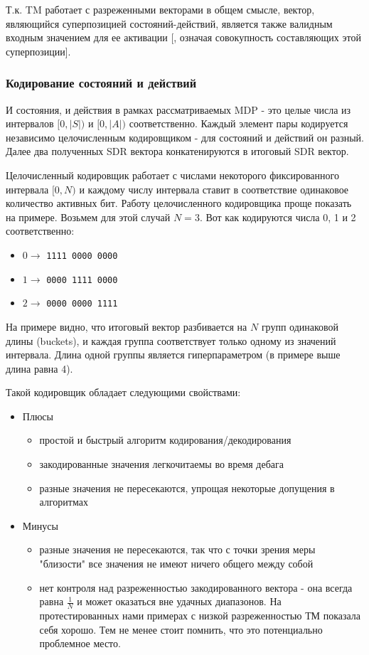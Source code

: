 \documentclass[a4paper]{article}
\begin{document}
Т.к. TM работает с разреженными векторами в общем смысле, вектор, являющийся суперпозицией состояний-действий, является также валидным входным значением для ее активации [, означая совокупность составляющих этой суперпозиции].

\subsubsection{Кодирование состояний и действий}

И состояния, и действия в рамках рассматриваемых MDP - это целые числа из интервалов $[0, |S|)$ и $[0, |A|)$ соответственно. Каждый элемент пары кодируется независимо целочисленным кодировщиком - для состояний и действий он разный. Далее два полученных SDR вектора конкатенируются в итоговый SDR вектор.

Целочисленный кодировщик работает с числами некоторого фиксированного интервала $[0, N)$ и каждому числу интервала ставит в соответствие одинаковое количество активных бит. Работу целочисленного кодировщика проще показать на примере. Возьмем для этой случай $N = 3$. Вот как кодируются числа 0, 1 и 2 соответственно:

\begin{itemize}
  \item $0 \rightarrow$ \verb|1111 0000 0000|
  \item $1 \rightarrow$ \verb|0000 1111 0000|
  \item $2 \rightarrow$ \verb|0000 0000 1111|
\end{itemize}

На примере видно, что итоговый вектор разбивается на $N$ групп одинаковой длины (buckets), и каждая группа соответствует только одному из значений интервала. Длина одной группы является гиперпараметром (в примере выше длина равна 4).

Такой кодировщик обладает следующими свойствами:

\begin{itemize}
  \item Плюсы
  \begin{itemize}
    \item простой и быстрый алгоритм кодирования/декодирования
    \item закодированные значения легкочитаемы во время дебага
    \item разные значения не пересекаются, упрощая некоторые допущения в алгоритмах
  \end{itemize}

  \item Минусы
  \begin{itemize}
    \item разные значения не пересекаются, так что с точки зрения меры "близости" все значения не имеют ничего общего между собой
    \item нет контроля над разреженностью закодированного вектора - она всегда равна $\frac{1}{N}$ и может оказаться вне удачных диапазонов. На протестированных нами примерах с низкой разреженностью ТМ показала себя хорошо. Тем не менее стоит помнить, что это потенциально проблемное место.
  \end{itemize}
\end{itemize}
\end{document}
